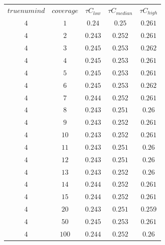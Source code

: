 \begin{table}[H]
\begin{tabular}{ccccc}
$truenumind$ & $coverage$ & ${\tau}C_{low}$ & ${\tau}C_{median}$ & ${\tau}C_{high}$\\
$4$ & $1$ & $0.24$ & $0.25$ & $0.261$\\
$4$ & $2$ & $0.243$ & $0.252$ & $0.261$\\
$4$ & $3$ & $0.245$ & $0.253$ & $0.262$\\
$4$ & $4$ & $0.245$ & $0.253$ & $0.261$\\
$4$ & $5$ & $0.245$ & $0.253$ & $0.261$\\
$4$ & $6$ & $0.245$ & $0.253$ & $0.262$\\
$4$ & $7$ & $0.244$ & $0.252$ & $0.261$\\
$4$ & $8$ & $0.243$ & $0.251$ & $0.26$\\
$4$ & $9$ & $0.243$ & $0.252$ & $0.261$\\
$4$ & $10$ & $0.243$ & $0.252$ & $0.261$\\
$4$ & $11$ & $0.243$ & $0.251$ & $0.26$\\
$4$ & $12$ & $0.243$ & $0.251$ & $0.26$\\
$4$ & $13$ & $0.243$ & $0.252$ & $0.26$\\
$4$ & $14$ & $0.244$ & $0.252$ & $0.261$\\
$4$ & $15$ & $0.244$ & $0.252$ & $0.261$\\
$4$ & $20$ & $0.243$ & $0.251$ & $0.259$\\
$4$ & $50$ & $0.245$ & $0.253$ & $0.261$\\
$4$ & $100$ & $0.244$ & $0.252$ & $0.26$\\
\end{tabular}
\end{table}
 